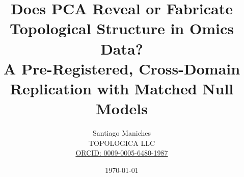 \documentclass[11pt]{article}
\title{\textbf{Does PCA Reveal or Fabricate Topological Structure in Omics Data?}\\
\large A Pre-Registered, Cross-Domain Replication with Matched Null Models}
\author{Santiago Maniches \\ \small TOPOLOGICA LLC \\ \small \href{https://orcid.org/0009-0005-6480-1987}{ORCID: 0009-0005-6480-1987}}
\date{\today}
\begin{document}
\maketitle

\begin{abstract}

\end{abstract}






\printbibliography
\end{document}
